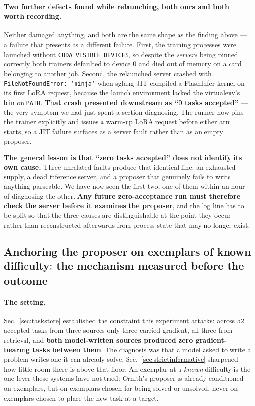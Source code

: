 \paragraph{Two further defects found while relaunching, both ours and both worth recording.}
Neither damaged anything, and both are the same shape as the finding above --- a failure that
presents as a different failure. First, the training processes were launched without
\texttt{CUDA\_VISIBLE\_DEVICES}, so despite the \emph{servers} being pinned correctly both
trainers defaulted to device $0$ and died out of memory on a card belonging to another job.
Second, the relaunched server crashed with \texttt{FileNotFoundError: 'ninja'} when sglang
JIT-compiled a FlashInfer kernel on its first LoRA request, because the launch environment
lacked the virtualenv's \texttt{bin} on \texttt{PATH}. \textbf{That crash presented downstream
as ``0 tasks accepted''} --- the very symptom we had just spent a section diagnosing. The
runner now pins the trainer explicitly and issues a warm-up LoRA request before either arm
starts, so a JIT failure surfaces as a server fault rather than as an empty proposer.

\textbf{The general lesson is that ``zero tasks accepted'' does not identify its own cause.}
Three unrelated faults produce that identical line: an exhausted supply, a dead inference
server, and a proposer that genuinely fails to write anything parseable. We have now seen the
first two, one of them within an hour of diagnosing the other. \textbf{Any future
zero-acceptance run must therefore check the server before it examines the proposer}, and the
log line has to be split so that the three causes are distinguishable at the point they occur
rather than reconstructed afterwards from process state that may no longer exist.

\subsection{Anchoring the proposer on exemplars of known difficulty: the mechanism measured
before the outcome}
\label{sec:anchoring}

\paragraph{The setting.} Sec.~\ref{sec:taskstore} established the constraint this experiment
attacks: across $52$ accepted tasks from three sources only three carried gradient, all three
from retrieval, and \textbf{both model-written sources produced zero gradient-bearing tasks
between them}. The diagnosis was that a model asked to write a problem writes one it can
already solve. Sec.~\ref{sec:strictinformative} sharpened how little room there is above that
floor. An exemplar at a \emph{known} difficulty is the one lever these systems have not tried:
Ornith's proposer is already conditioned on exemplars, but on exemplars chosen for being solved
or unsolved, never on exemplars chosen to place the new task at a target.

